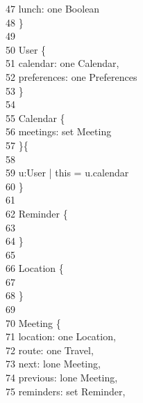 \-    \ 47      \qquad \-\qquad lunch: {\color{blue}one} Boolean\\
\-    \ 48      \qquad \}\\
\-    \ 49      \qquad \\
\-    \ 50       User \{\\
\-    \ 51      \qquad \-\qquad calendar: {\color{blue}one} Calendar,\\
\-    \ 52      \qquad \-\qquad preferences: {\color{blue}one} Preferences\\
\-    \ 53      \qquad  \}\\
\-    \ 54      \qquad \\
\-    \ 55       Calendar \{\\
\-    \ 56      \qquad \-\qquad meetings: {\color{blue}set} Meeting\\
\-    \ 57      \qquad \}\{\\
\-    \ 58      \qquad \-\\
\-    \ 59      \qquad \- u:User | this = u.calendar\\
\-    \ 60      \qquad \}\\
\-    \ 61      \qquad \\
\-    \ 62       Reminder \{\\
\-    \ 63      \qquad \\
\-    \ 64      \qquad \}\\
\-    \ 65      \qquad \\
\-    \ 66       Location \{\\
\-    \ 67      \qquad \\
\-    \ 68      \qquad \}\\
\-    \ 69      \qquad \\
\-    \ 70       Meeting \{\\
\-    \ 71      \qquad \-\qquad location: {\color{blue}one} Location,\\
\-    \ 72      \qquad \-\qquad route: {\color{blue}one} Travel,\\
\-    \ 73      \qquad \-\qquad next: {\color{blue}lone} Meeting,\\
\-    \ 74      \qquad \-\qquad previous: {\color{blue}lone} Meeting,\\
\-    \ 75      \qquad \-\qquad reminders: {\color{blue}set} Reminder,\\
